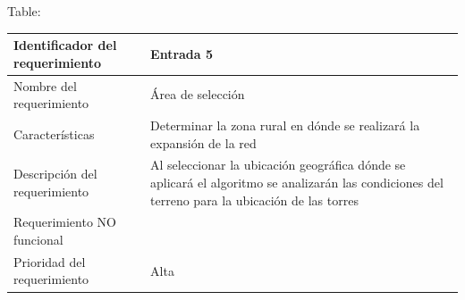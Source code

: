 \documentclass[]{article}
\begin{document}
Table:

\begin{longtable}[]{@{}ll@{}}
\toprule
\begin{minipage}[b]{0.39\columnwidth}\raggedright\strut
Identificador del requerimiento\strut
\end{minipage} & \begin{minipage}[b]{0.50\columnwidth}\raggedright\strut
Entrada 5\strut
\end{minipage}\tabularnewline
\midrule
\endhead
\begin{minipage}[t]{0.39\columnwidth}\raggedright\strut
Nombre del requerimiento\strut
\end{minipage} & \begin{minipage}[t]{0.50\columnwidth}\raggedright\strut
Área de selección\strut
\end{minipage}\tabularnewline
\begin{minipage}[t]{0.39\columnwidth}\raggedright\strut
Características\strut
\end{minipage} & \begin{minipage}[t]{0.50\columnwidth}\raggedright\strut
Determinar la zona rural en dónde se realizará la expansión de la
red\strut
\end{minipage}\tabularnewline
\begin{minipage}[t]{0.39\columnwidth}\raggedright\strut
Descripción del requerimiento\strut
\end{minipage} & \begin{minipage}[t]{0.50\columnwidth}\raggedright\strut
Al seleccionar la ubicación geográfica dónde se aplicará el algoritmo se
analizarán las condiciones del terreno para la ubicación de las
torres\strut
\end{minipage}\tabularnewline
\begin{minipage}[t]{0.39\columnwidth}\raggedright\strut
Requerimiento NO funcional\strut
\end{minipage} & \begin{minipage}[t]{0.50\columnwidth}\raggedright\strut
\strut
\end{minipage}\tabularnewline
\begin{minipage}[t]{0.39\columnwidth}\raggedright\strut
Prioridad del requerimiento\strut
\end{minipage} & \begin{minipage}[t]{0.50\columnwidth}\raggedright\strut
Alta\strut
\end{minipage}\tabularnewline
\bottomrule
\end{longtable}
\end{document}
